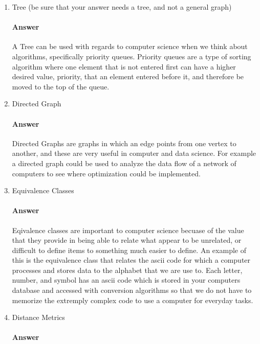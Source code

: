 \documentclass{article}
\begin{document}
\begin{enumerate}

    \item Tree (be sure that your answer needs a tree, and not a general graph)

        \paragraph{Answer}

       A Tree can be used with regards to computer science when we think about algorithms, specifically priority queues. Priority queues are a type of sorting algorithm where one element that is not entered first can have a higher desired value, priority, that an element entered before it, and therefore be moved to the top of the queue.

    \item Directed Graph

        \paragraph{Answer}

       Directed Graphs are graphs in which an edge points from one vertex to another, and these are very useful in computer and data science. For example a directed graph could be used to analyze the data flow of a network of computers to see where optimization could be implemented. 
    \item Equivalence Classes

        \paragraph{Answer}

        Eqivalence classes are important to computer science becuase of the value that they provide in being able to relate what appear to be unrelated, or difficult to define items to something much easier to define. An example of this is the equivalence class that relates the ascii code for which a computer processes and stores data to the alphabet that we are use to. Each letter, number, and symbol has an ascii code which is stored in your computers database and accessed with conversion algorithms so that we do not have to memorize the extremply complex code to use a computer for everyday tasks.

    \item Distance Metrics

        \paragraph{Answer}


\end{enumerate}
\end{document}
